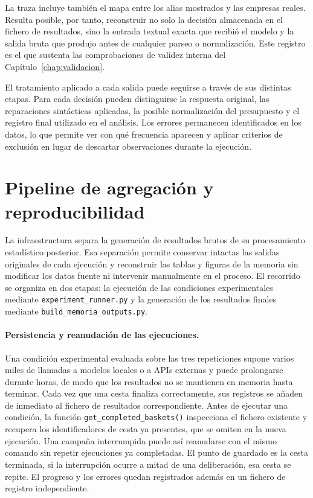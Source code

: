 La traza incluye también el mapa entre los alias mostrados y las empresas reales. Resulta posible, por tanto, reconstruir no solo la decisión almacenada en el fichero de resultados, sino la entrada textual exacta que recibió el modelo y la salida bruta que produjo antes de cualquier parseo o normalización. Este registro es el que sustenta las comprobaciones de validez interna del Capítulo~\ref{chap:validacion}.

El tratamiento aplicado a cada salida puede seguirse a través de sus distintas etapas. Para cada decisión pueden distinguirse la respuesta original, las reparaciones sintácticas aplicadas, la posible normalización del presupuesto y el registro final utilizado en el análisis. Los errores permanecen identificados en los datos, lo que permite ver con qué frecuencia aparecen y aplicar criterios de exclusión en lugar de descartar observaciones durante la ejecución.

\section{Pipeline de agregación y reproducibilidad}
\label{sec:pipeline_agregacion}

La infraestructura separa la generación de resultados brutos de su procesamiento estadístico posterior. Esa separación permite conservar intactas las salidas originales de cada ejecución y reconstruir las tablas y figuras de la memoria sin modificar los datos fuente ni intervenir manualmente en el proceso. El recorrido se organiza en dos etapas: la ejecución de las condiciones experimentales mediante \texttt{experiment\_runner.py} y la generación de los resultados finales mediante \texttt{build\_memoria\_outputs.py}.

\paragraph{Persistencia y reanudación de las ejecuciones.}
Una condición experimental evaluada sobre las tres repeticiones supone varios miles de llamadas a modelos locales o a APIs externas y puede prolongarse durante horas, de modo que los resultados no se mantienen en memoria hasta terminar. Cada vez que una cesta finaliza correctamente, sus registros se añaden de inmediato al fichero de resultados correspondiente. Antes de ejecutar una condición, la función \texttt{get\_completed\_baskets()} inspecciona el fichero existente y recupera los identificadores de cesta ya presentes, que se omiten en la nueva ejecución. Una campaña interrumpida puede así reanudarse con el mismo comando sin repetir ejecuciones ya completadas. El punto de guardado es la cesta terminada, si la interrupción ocurre a mitad de una deliberación, esa cesta se repite. El progreso y los errores quedan registrados además en un fichero de registro independiente.

